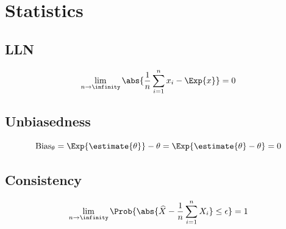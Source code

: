 \documentclass[18pt,a3paper,landscape, ncols=3]{cheatsheet}
\begin{document}

\section{Statistics} \seperator
	\subsection{LLN}
		\begin{mdframed}
			\[
				\lim_{n \rightarrow \infinity} \abs{\frac{1}{n} \sum_{i=1}^{n} x_i - \Exp{x}} = 0
			\]
		\end{mdframed}
	\subsection{Unbiasedness}
		\begin{mdframed}
			\[
				\mathrm{Bias}_{\theta} = \Exp{\estimate{\theta}} - \theta = \Exp{\estimate{\theta} - \theta} = 0
			\]
		\end{mdframed}
	\subsection{Consistency}
		\begin{mdframed}
			\[
				\lim_{n \rightarrow \infinity} \Prob{ \abs{\widehat{X} - \frac{1}{n}\sum_{i=1}^{n} X_i} \leq \epsilon} = 1
			\]
		\end{mdframed}
\end{document}
